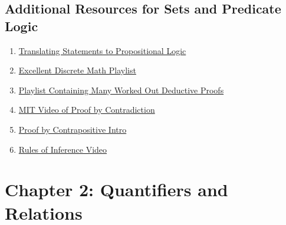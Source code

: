 \documentclass{article}
\begin{document}
\subsection*{Additional Resources for Sets and Predicate Logic}
\begin{enumerate}
    \item \href{https://www.youtube.com/watch?v=A2k3ulOJ3u4}{Translating Statements to Propositional Logic} 
    \item \href{https://www.youtube.com/watch?v=A3Ffwsnad0k&list=PLl-gb0E4MII28GykmtuBXNUNoej-vY5Rz}{Excellent Discrete Math Playlist}
    \item \href{https://www.youtube.com/watch?v=6o1kLNEE-d4&list=PLF_J2w5w0Z3E7jZGz-23P6WrKxokXBkHC}{Playlist Containing Many Worked Out Deductive Proofs}
    \item \href{https://www.youtube.com/watch?v=CpW0ZJ7i0oc}{MIT Video of Proof by Contradiction}
    \item \href{https://www.youtube.com/watch?v=0YqZIHFmVzg}{Proof by Contrapositive Intro}
    \item \href{https://www.youtube.com/watch?v=8DW0K3mnc-0}{Rules of Inference Video}
\end{enumerate}
\newpage

\section*{Chapter 2: Quantifiers and Relations}
\end{document}
